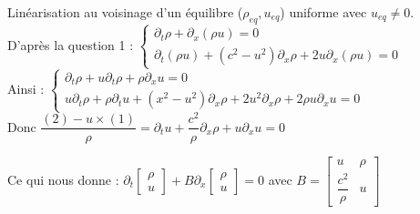 \documentclass[12pt,a4paper]{article}
\begin{document}
\begin{sol}
\begin{enumerate}
\begin{minipage}{17cm}
			\item Linéarisation au voisinage d'un équilibre ($\rho_{eq},u_{eq}$) uniforme avec $u_{eq} \not = 0$.\\
			D'après la question 1 : $\begin{cases}
				\partial_t \rho + \partial_x(\rho u) = 0\\
				\partial_t(\rho u) + (c^2-u^2)\partial_x\rho + 2u\partial_x(\rho u) = 0
			\end{cases}$\\
			Ainsi : $\begin{cases}
				\partial_t \rho + u \partial_t \rho + \rho \partial_x u = 0\\
				u \partial_t \rho + \rho \partial_tu + (x^2-u^2)\partial_x \rho + 2u^2\partial_x \rho + 2\rho u \partial_x u = 0
			\end{cases}$\\
			Donc $\dfrac{(2)-u\times(1)}{\rho} = \partial_t u + \dfrac{c^2}{\rho} \partial_x\rho+u\partial_x u = 0$
			
			Ce qui nous donne : $\partial_t \begin{bmatrix}
				\rho \\
				u
			\end{bmatrix} + B \partial_x \begin{bmatrix}
			\rho\\
			u
			\end{bmatrix} = 0$ avec $B = \begin{bmatrix}
			u & \rho \\
			\dfrac{c^2}{\rho} & u
			\end{bmatrix}$\\
			

\end{minipage}
\end{enumerate}
\end{sol}
\end{document}
